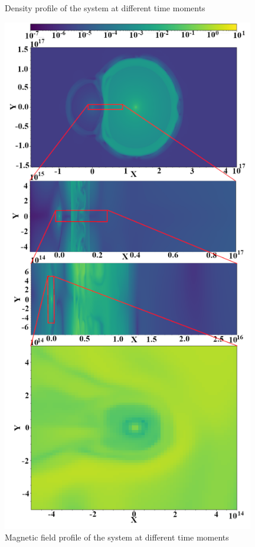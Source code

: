\documentclass[a4paper,12pt]{extreport}
\begin{document}
\begin{figure}[h!]
\begin{minipage}{0.48\textwidth}
		\caption{Density profile of the system at different time moments}
		\label{density}
	\end{minipage}\hfill
	\begin{minipage}{0.48\textwidth}
		\centering
		\includegraphics[width=0.98\textwidth]{./fig/Bfield.png} 
		\caption{Magnetic field profile of the system at different time moments}
		\label{Bfield}
	\end{minipage}
\end{figure}
 
\end{document}
